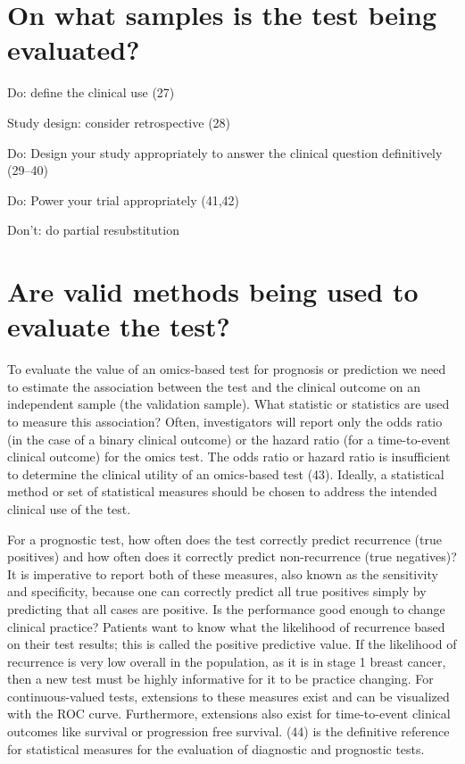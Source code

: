 \documentclass[11pt]{article}
\begin{document}
\section{On what samples is the test being
evaluated?}\label{on-what-samples-is-the-test-being-evaluated}

Do: define the clinical use (27)

Study design: consider retrospective (28)

Do: Design your study appropriately to answer the clinical question
definitively (29--40)

Do: Power your trial appropriately (41,42)

Don't: do partial resubstitution

\section{Are valid methods being used to evaluate the
test?}\label{are-valid-methods-being-used-to-evaluate-the-test}

To evaluate the value of an omics-based test for prognosis or prediction
we need to estimate the association between the test and the clinical
outcome on an independent sample (the validation sample). What statistic
or statistics are used to measure this association? Often, investigators
will report only the odds ratio (in the case of a binary clinical
outcome) or the hazard ratio (for a time-to-event clinical outcome) for
the omics test. The odds ratio or hazard ratio is insufficient to
determine the clinical utility of an omics-based test (43). Ideally, a
statistical method or set of statistical measures should be chosen to
address the intended clinical use of the test.

For a prognostic test, how often does the test correctly predict
recurrence (true positives) and how often does it correctly predict
non-recurrence (true negatives)? It is imperative to report both of
these measures, also known as the sensitivity and specificity, because
one can correctly predict all true positives simply by predicting that
all cases are positive. Is the performance good enough to change
clinical practice? Patients want to know what the likelihood of
recurrence based on their test results; this is called the positive
predictive value. If the likelihood of recurrence is very low overall in
the population, as it is in stage 1 breast cancer, then a new test must
be highly informative for it to be practice changing. For
continuous-valued tests, extensions to these measures exist and can be
visualized with the ROC curve. Furthermore, extensions also exist for
time-to-event clinical outcomes like survival or progression free
survival. (44) is the definitive reference for statistical measures for
the evaluation of diagnostic and prognostic tests.
\end{document}
